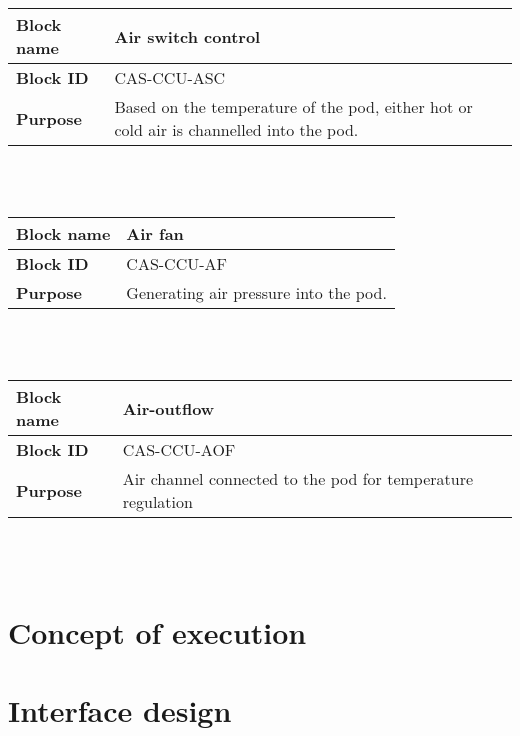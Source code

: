 \begin{tabular}{|l|p{10cm}|}
    \hline
    \textbf{Block name}     & Air switch control \\
    \hline
    \textbf{Block ID}       & CAS-CCU-ASC \\
    \hline
    \textbf{Purpose}        & Based on the temperature of the pod, either hot or cold air is channelled into the pod.  \\
    \hline
\end{tabular}\\\\

\begin{tabular}{|l|p{10cm}|}
    \hline
    \textbf{Block name}     & Air fan \\
    \hline
    \textbf{Block ID}       & CAS-CCU-AF \\
    \hline
    \textbf{Purpose}        & Generating air pressure into the pod.  \\
    \hline
\end{tabular}\\\\

\begin{tabular}{|l|p{10cm}|}
    \hline
    \textbf{Block name}     & Air-outflow \\
    \hline
    \textbf{Block ID}       & CAS-CCU-AOF \\
    \hline
    \textbf{Purpose}        & Air channel connected to the pod for temperature regulation  \\
    \hline
\end{tabular}\\\\

\section{Concept of execution}
\label{sec:concept_execution}

\section{Interface design}
\label{sec:arch_interface}

